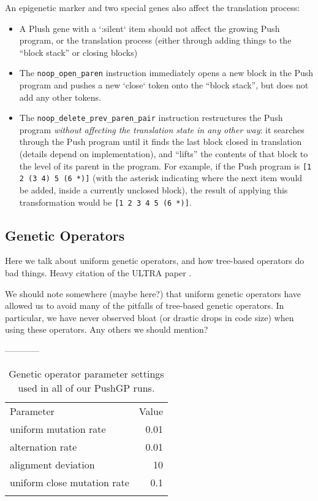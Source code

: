 An epigenetic marker and two special genes also affect the translation process:

\begin{itemize}
\item
A Plush gene with a `:silent` item should not affect the growing Push program, or the translation process (either through adding things to the ``block stack'' or closing blocks)

\item
The  \texttt{noop\_open\_paren} instruction immediately opens a new block in the Push program and pushes a new `close` token onto the ``block stack'', but does not add any other tokens.

\item
The  \texttt{noop\_delete\_prev\_paren\_pair}  instruction restructures the Push program \textit{without affecting the translation state in any other way}: it searches through the Push program until it finds the last block closed in translation (details depend on implementation), and ``lifts'' the contents of that block to the level of its parent in the program. For example, if the Push program is \texttt{[1 2 (3 4) 5 (6 *)]} (with the asterisk indicating where the next item would be added, inside a currently unclosed block), the result of applying this transformation would be \texttt{[1 2 3 4 5 (6 *)]}.

\end{itemize}

\subsection{Genetic Operators}
\label{section:genetic-operators}

Here we talk about uniform genetic operators, and how tree-based operators do bad things. Heavy citation of the ULTRA paper \citep{Spector:2013:GPTP}.

We should note somewhere (maybe here?) that uniform genetic operators have allowed us to avoid many of the pitfalls of tree-based genetic operators. In particular, we have never observed bloat (or drastic drops in code size) when using these operators. Any others we should mention?

------------

\begin{table}[t]
\centering
\caption{Genetic operator parameter settings used in all of our PushGP runs.}
\label{tableGPconstantParams}
\begin{tabular}{l r}
\hline\noalign{\smallskip}
Parameter & Value \tabularnewline
\noalign{\smallskip}\svhline\noalign{\smallskip}
uniform mutation rate & 0.01 \tabularnewline
alternation rate & 0.01 \tabularnewline
alignment deviation & 10 \tabularnewline
uniform close mutation rate & 0.1 \tabularnewline
\noalign{\smallskip}\hline\noalign{\smallskip}
\end{tabular}
\end{table}



